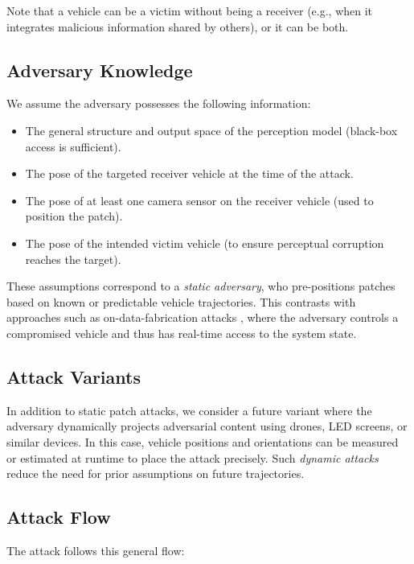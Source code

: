Note that a vehicle can be a victim without being a receiver (e.g., when it integrates malicious information shared by others), or it can be both.

\subsection{Adversary Knowledge}

We assume the adversary possesses the following information:

\begin{itemize}
    \item The general structure and output space of the perception model (black-box access is sufficient).
    \item The pose of the targeted receiver vehicle at the time of the attack.
    \item The pose of at least one camera sensor on the receiver vehicle (used to position the patch).
    \item The pose of the intended victim vehicle (to ensure perceptual corruption reaches the target).
\end{itemize}

These assumptions correspond to a \textit{static adversary}, who pre-positions patches based on known or predictable vehicle trajectories. This contrasts with approaches such as on-data-fabrication attacks \cite{zhang2023datafabricationcollaborativevehicular}, where the adversary controls a compromised vehicle and thus has real-time access to the system state.

\subsection{Attack Variants}

In addition to static patch attacks, we consider a future variant where the adversary dynamically projects adversarial content using drones, LED screens, or similar devices. In this case, vehicle positions and orientations can be measured or estimated at runtime to place the attack precisely. Such \textit{dynamic attacks} reduce the need for prior assumptions on future trajectories.

\subsection{Attack Flow}

The attack follows this general flow:

